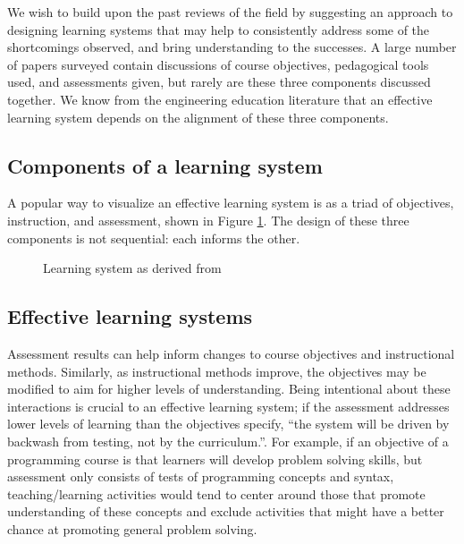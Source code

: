 \documentclass[12pt]{article}
\begin{document}
We wish to build upon the past reviews of the field by suggesting an
approach to designing learning systems that may help to consistently
address some of the shortcomings observed, and bring understanding to
the successes. A large number of papers surveyed contain discussions
of course objectives, pedagogical tools used, and assessments given,
but rarely are these three components discussed together. We know from
the engineering education literature that an effective learning system
depends on the alignment of these three
components\autocite{jamieson_creating_2009,pellegrino_rethinking_2006}.

\subsection*{Components of a learning
system}\label{sec:components-of-a-learning-system}
A popular way to visualize an effective learning system is as a triad
of objectives, instruction, and
assessment\autocite{felder_designing_2003}, shown in Figure
\ref{fig:learning-system}. The design of these three components is not
sequential: each informs the other.

\begin{figure}[!ht]
  \centering
  \caption{Learning system as derived from
    \citeauthor{felder_designing_2003}\autocite{felder_designing_2003}}
  \label{fig:learning-system}
\end{figure}

\subsection*{Effective learning systems}\label{sec:effective-learning-systems}

Assessment results can help inform changes to course objectives and
instructional methods\autocite{felder_designing_2003}. Similarly, as
instructional methods improve, the objectives may be modified to aim
for higher levels of understanding. Being intentional about these
interactions is crucial to an effective learning system; if the
assessment addresses lower levels of learning than the objectives
specify, ``the system will be driven by backwash from testing, not by
the curriculum.''\autocite[][p. 350]{biggs_enhancing_1996}. For
example, if an objective of a programming course is that learners will
develop problem solving skills, but assessment only consists of tests
of programming concepts and syntax, teaching/learning activities would
tend to center around those that promote understanding of these
concepts and exclude activities that might have a better chance at
promoting general problem solving\autocite{biggs_enhancing_1996}.
\end{document}
